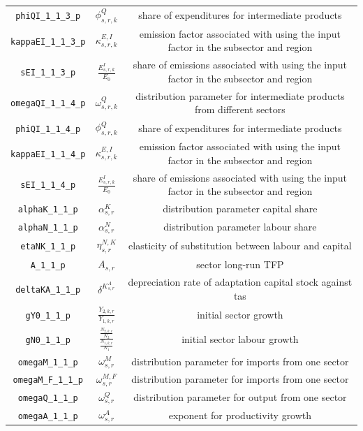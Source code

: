 \begin{center}
\begin{longtable}{ccc}
\texttt{phiQI\_1\_1\_3\_p} & ${\phi^{Q}_{s,r,k}}$ & share of expenditures for intermediate products\\
\texttt{kappaEI\_1\_1\_3\_p} & ${\kappa^{E,I}_{s,r,k}}$ & emission factor associated with using the input factor in the subsector and region\\
\texttt{sEI\_1\_1\_3\_p} & ${\frac{E^{I}_{s,r,k}}{E_0}}$ & share of emissions associated with using the input factor in the subsector and region\\
\texttt{omegaQI\_1\_1\_4\_p} & ${\omega^{Q}_{s,r,k}}$ & distribution parameter for intermediate products from different sectors\\
\texttt{phiQI\_1\_1\_4\_p} & ${\phi^{Q}_{s,r,k}}$ & share of expenditures for intermediate products\\
\texttt{kappaEI\_1\_1\_4\_p} & ${\kappa^{E,I}_{s,r,k}}$ & emission factor associated with using the input factor in the subsector and region\\
\texttt{sEI\_1\_1\_4\_p} & ${\frac{E^{I}_{s,r,k}}{E_0}}$ & share of emissions associated with using the input factor in the subsector and region\\
\texttt{alphaK\_1\_1\_p} & ${\alpha^{K}_{s,r}}$ & distribution parameter capital share\\
\texttt{alphaN\_1\_1\_p} & ${\alpha^{N}_{s,r}}$ & distribution parameter labour share\\
\texttt{etaNK\_1\_1\_p} & ${\eta^{N,K}_{s,r}}$ & elasticity of substitution between labour and capital\\
\texttt{A\_1\_1\_p} & ${A_{s,r}}$ & sector long-run TFP\\
\texttt{deltaKA\_1\_1\_p} & ${\delta^{K^{A}_{s,r}}}$ & depreciation rate of adaptation capital stock against tas\\
\texttt{gY0\_1\_1\_p} & ${\frac{Y_{2,k,r}}{Y_{1,k,r}}}$ & initial sector growth\\
\texttt{gN0\_1\_1\_p} & ${\frac{\frac{N_{2,k,r}}{N_{2}}}{\frac{N_{1,k,r}}{N_{1}}}}$ & initial sector labour growth\\
\texttt{omegaM\_1\_1\_p} & ${\omega^{M}_{s,r}}$ & distribution parameter for imports from one sector\\
\texttt{omegaM\_F\_1\_1\_p} & ${\omega^{M,F}_{s,r}}$ & distribution parameter for imports from one sector\\
\texttt{omegaQ\_1\_1\_p} & ${\omega^{Q}_{s,r}}$ & distribution parameter for output from one sector\\
\texttt{omegaA\_1\_1\_p} & ${\omega^{A}_{s,r}}$ & exponent for productivity growth\\

\end{longtable}
\end{center}
